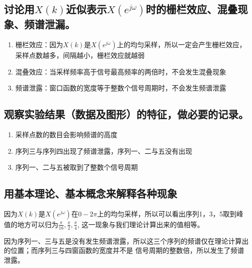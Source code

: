 \documentclass{../source/zjureport}
\begin{document}
        \subsection{讨论用$X(k)$近似表示$X(e^{j\omega})$时的栅栏效应、混叠现象、频谱泄漏。}
            \begin{enumerate}
                \item 栅栏效应：因为$X(k)$是$X(e^{j\omega})$上的均匀采样，所以一定会产生栅栏效应，采样点数越多，间隔越小，栅栏效应就越弱
                \item 混叠效应：当采样频率高于信号最高频率的两倍时，不会发生混叠现象
                \item 频谱泄露：窗口函数的宽度等于整数个信号周期时，不会发生频谱泄露
            \end{enumerate}
        
        \subsection{观察实验结果（数据及图形）的特征，做必要的记录。}
            \begin{enumerate}
                \item 采样点数的数目会影响频谱的高度
                \item 序列三与序列四出现了频谱泄露，序列一、二与五没有出现
                \item 序列一、二与五被取到了整数个信号周期
            \end{enumerate}

        \subsection{用基本理论、基本概念来解释各种现象}
            因为$X(k)$是$X(e^{j\omega})$在$0-2\pi$上的均匀采样，所以可以看出序列1，3，5取到峰值的地方可以归为$\frac{\pi}{16},\frac{\pi}{2},\frac{\pi}{4}$,
            这一现象与我们理论计算出来的值相等。

            因为序列一、三与五是没有发生频谱泄露，所以这三个序列的频谱仅在理论计算出的位置；而序列三与四窗函数的宽度并不是
            信号周期的整数倍，所以发生了频谱泄露。
\end{document}
